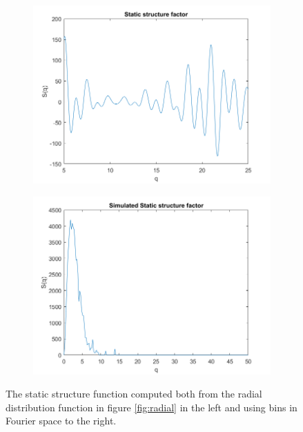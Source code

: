 \begin{figure}[H]
    \centering
    \captionsetup[subfigure]{justification=centering}
    \begin{subfigure}[b]{0.40\textwidth}
        \centering
        \includegraphics[width=\textwidth]{graphics/task8/integral.png}
    \end{subfigure}
    \begin{subfigure}[b]{0.40\textwidth}
        \centering
        \includegraphics[width=\textwidth]{graphics/task8/simulated.png}
    \end{subfigure}
    \caption{The static structure function computed both from the radial distribution function in figure \ref{fig:radial} in the left and using bins in Fourier space to the right.}
    \label{fig:StaticStructure}
\end{figure}

